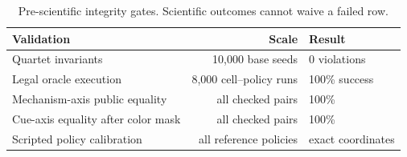 
\begin{table}[t]
  \centering
  \small
  \begin{tabular}{lrl}
    \toprule
    Validation & Scale & Result \\
    \midrule
    Quartet invariants & 10,000 base seeds & 0 violations \\
    Legal oracle execution & 8,000 cell--policy runs &
      100\% success \\
    Mechanism-axis public equality & all checked pairs & 100\% \\
    Cue-axis equality after color mask & all checked pairs & 100\% \\
    Scripted policy calibration & all reference policies & exact coordinates \\
    \bottomrule
  \end{tabular}
  \caption{Pre-scientific integrity gates. Scientific outcomes cannot waive a
  failed row.}
  \label{tab:integrity}
\end{table}
